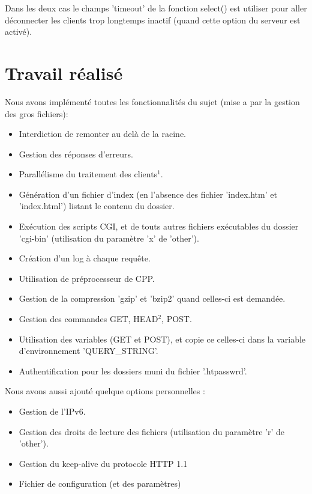 \documentclass[12pt,a4paper,utf8x]{report}
\begin{document}
Dans les deux cas le champs 'timeout' de la fonction select() est utiliser pour aller déconnecter les clients trop longtemps inactif (quand cette option du serveur est activé).

\chapter{Travail réalisé}
Nous avons implémenté toutes les fonctionnalités du sujet (mise a par la gestion des gros fichiers): 

\begin{itemize}
\renewcommand{\labelitemi}{-}
\item Interdiction de remonter au delà de la racine.
\item Gestion des réponses d'erreurs.
\item Parallélisme du traitement des clients$^{1}$.
\item Génération d'un fichier d'index (en l'absence des fichier 'index.htm' et 'index.html') listant le contenu du dossier.
\item Exécution des scripts CGI, et de touts autres fichiers exécutables du dossier 'cgi-bin' (utilisation du paramètre 'x' de 'other').
\item Création d'un log à chaque requête.
\item Utilisation de préprocesseur de CPP.
\item Gestion de la compression 'gzip' et 'bzip2' quand celles-ci est demandée.
\item Gestion des commandes GET, HEAD$^{2}$, POST.
\item Utilisation des variables (GET et POST), et copie ce celles-ci dans la variable d'environnement 'QUERY\_STRING'.
\item Authentification pour les dossiers muni du fichier '.htpasswrd'.
\end{itemize}

Nous avons aussi ajouté quelque options personnelles :

\begin{itemize}
\renewcommand{\labelitemi}{-}
\item Gestion de l'IPv6.
\item Gestion des droits de lecture des fichiers (utilisation du paramètre 'r' de 'other').
\item Gestion du keep-alive du protocole HTTP 1.1
\item Fichier de configuration (et des paramètres)
\end{itemize}
\end{document}
